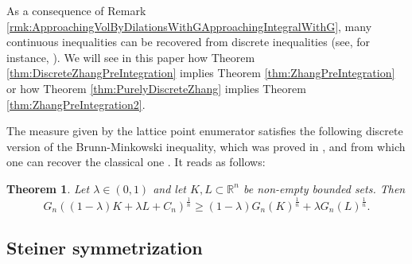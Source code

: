 \documentclass[10pt]{amsart}
\newtheorem{thm}{Theorem}[section]
\def\R{\mathbb{R}}
\numberwithin{equation}{section}
\begin{document}
As a consequence of Remark \ref{rmk:ApproachingVolByDilationsWithGApproachingIntegralWithG}, many continuous inequalities can be recovered from discrete inequalities (see, for instance, \cite[Section 3.1]{ALY}). We will see in this paper how Theorem \ref{thm:DiscreteZhangPreIntegration} implies Theorem \ref{thm:ZhangPreIntegration} or how Theorem \ref{thm:PurelyDiscreteZhang} implies Theorem \ref{thm:ZhangPreIntegration2}.

The measure given by the lattice point enumerator satisfies the following discrete version of the Brunn-Minkowski inequality, which was proved in \cite[Theorem 2.1]{IYNZ}, and from which one can recover the classical one \cite[Theorem 7.1.1]{Sch}. It reads as
follows:
\begin{thm}\label{thm: BM_lattice_point_no_G(K)G(L)>0}
Let $\lambda\in(0,1)$ and let $K,L\subset\R^n$ be non-empty bounded sets. Then
$$
G_n\left((1-\lambda)K+\lambda L+C_n\right)^\frac{1}{n}\geq(1-\lambda)G_n(K)^\frac{1}{n}+\lambda G_n(L)^\frac{1}{n}.
$$
\end{thm}
\subsection{Steiner symmetrization}\label{subsec:SteinerSymmetrization}
\end{document}
